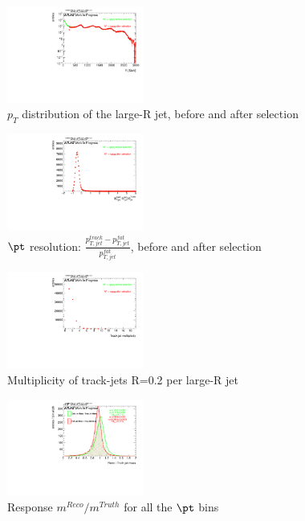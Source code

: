 \begin{figure}
 
\includegraphics[width=0.4\textwidth]{appendixB/mTAS_W_calibmCal_20:07:01-03-11-2016/1cfrt_h_FatJet_pt.pdf}
\caption{$p_{T}$ distribution of the large-R jet, before and after selection}
 
\end{figure}
 
\begin{figure}
 
\includegraphics[width=0.4\textwidth]{appendixB/mTAS_W_calibmCal_20:07:01-03-11-2016/1cfrt_h_FatJet_ptres.pdf}
\caption{$\pt$ resolution: $\frac{p_{T,jet}^{track}-p_{T,jet}^{fat}}{p_{T,jet}^{fat}}$, before and after selection }
 
\end{figure}
 
\begin{figure}
 
\includegraphics[width=0.4\textwidth]{appendixB/mTAS_W_calibmCal_20:07:01-03-11-2016/1cfrt_h_FatJet_TAmult.pdf}
\caption{Multiplicity of track-jets R=0.2 per large-R jet}
 
\end{figure}
\begin{figure}
 
\includegraphics[width=0.4\textwidth]{appendixB/mTAS_W_calibmCal_20:07:01-03-11-2016/1cfrt_h_JetRatio_m.pdf}
\caption{Response $m^{Reco} / m^{Truth}$ for all the $\pt$ bins}
 
\end{figure}
 
